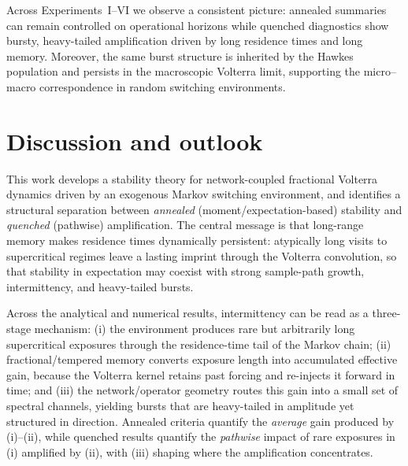 \documentclass[12pt,a4paper]{article}
\theoremstyle{plain}
\theoremstyle{definition}
\theoremstyle{remark}
\begin{document}
Across Experiments~I--VI we observe a consistent picture:
annealed summaries can remain controlled on operational horizons while quenched diagnostics show bursty, heavy-tailed amplification driven
by long residence times and long memory.
Moreover, the same burst structure is inherited by the Hawkes population and persists in the macroscopic Volterra limit, supporting the
micro--macro correspondence in random switching environments.


\section{Discussion and outlook}
\label{sec:discussion}

This work develops a stability theory for network-coupled fractional Volterra
dynamics driven by an exogenous Markov switching environment, and identifies a
structural separation between \emph{annealed} (moment/expectation-based) stability
and \emph{quenched} (pathwise) amplification.
The central message is that long-range memory makes residence times dynamically
persistent: atypically long visits to supercritical regimes leave a lasting
imprint through the Volterra convolution, so that stability in expectation may
coexist with strong sample-path growth, intermittency, and heavy-tailed bursts.

Across the analytical and numerical results, intermittency can be read as a
three-stage mechanism:
(i) the environment produces rare but arbitrarily long supercritical exposures
through the residence-time tail of the Markov chain;
(ii) fractional/tempered memory converts exposure length into accumulated
effective gain, because the Volterra kernel retains past forcing and re-injects it
forward in time; and
(iii) the network/operator geometry routes this gain into a small set of spectral
channels, yielding bursts that are heavy-tailed in amplitude yet structured in
direction.
Annealed criteria quantify the \emph{average} gain produced by (i)--(ii), while
quenched results quantify the \emph{pathwise} impact of rare exposures in (i)
amplified by (ii), with (iii) shaping where the amplification concentrates.
\end{document}
